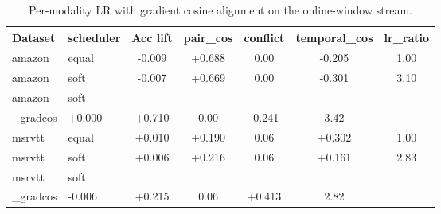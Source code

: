 \begin{table}[t]\centering
\caption{Per-modality LR with gradient cosine alignment on the online-window stream.}
\label{tab:agod-gradcos-lr}
\begin{tabular}{llccccc}\toprule
Dataset & scheduler & Acc lift & pair\_cos & conflict & temporal\_cos & lr\_ratio \\
\midrule
amazon & equal & -0.009 & +0.688 & 0.00 & -0.205 & 1.00 \\
amazon & soft & -0.007 & +0.669 & 0.00 & -0.301 & 3.10 \\
amazon & soft\\_gradcos & +0.000 & +0.710 & 0.00 & -0.241 & 3.42 \\
msrvtt & equal & +0.010 & +0.190 & 0.06 & +0.302 & 1.00 \\
msrvtt & soft & +0.006 & +0.216 & 0.06 & +0.161 & 2.83 \\
msrvtt & soft\\_gradcos & -0.006 & +0.215 & 0.06 & +0.413 & 2.82 \\
\bottomrule
\end{tabular}
\end{table}

